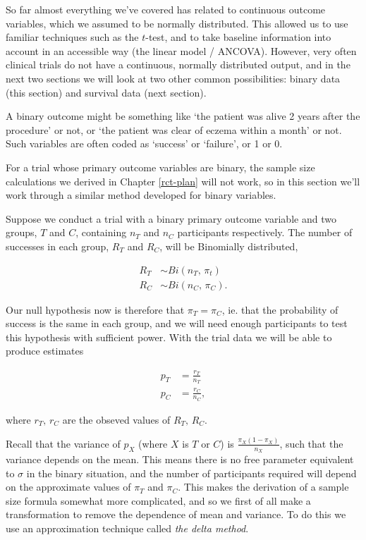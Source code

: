 \documentclass[
  openany]{book}
\theoremstyle{definition}
\theoremstyle{definition}
\theoremstyle{definition}
\theoremstyle{definition}
\theoremstyle{remark}
\begin{document}
So far almost everything we've covered has related to continuous outcome variables, which we assumed to be normally distributed. This allowed us to use familiar techniques such as the \(t\)-test, and to take baseline information into account in an accessible way (the linear model / ANCOVA). However, very often clinical trials do not have a continuous, normally distributed output, and in the next two sections we will look at two other common possibilities: binary data (this section) and survival data (next section).

A binary outcome might be something like `the patient was alive 2 years after the procedure' or not, or `the patient was clear of eczema within a month' or not. Such variables are often coded as `success' or `failure', or 1 or 0.

For a trial whose primary outcome variables are binary, the sample size calculations we derived in Chapter \ref{rct-plan} will not work, so in this section we'll work through a similar method developed for binary variables.

Suppose we conduct a trial with a binary primary outcome variable and two groups, \(T\) and \(C\), containing \(n_T\) and \(n_C\) participants respectively. The number of successes in each group, \(R_T\) and \(R_C\), will be Binomially distributed,

\begin{align*}
      R_T &\sim{Bi\left(n_T,\, \pi_t\right)} \\
      R_C &\sim{Bi\left(n_C,\,\pi_C\right)}.
\end{align*}

Our null hypothesis now is therefore that \(\pi_T = \pi_C\), ie. that the probability of success is the same in each group, and we will need enough participants to test this hypothesis with sufficient power. With the trial data we will be able to produce estimates

\begin{align*}
      p_T & = \frac{r_T}{n_T} \\
      p_C & = \frac{r_C}{n_C},
\end{align*}

where \(r_T,\,r_C\) are the obseved values of \(R_T,\,R_C.\)

Recall that the variance of \(p_X\) (where \(X\) is \(T\) or \(C\)) is \(\frac{\pi_X\left(1-\pi_X\right)}{n_X}\), such that the variance depends on the mean. This means there is no free parameter equivalent to \(\sigma\) in the binary situation, and the number of participants required will depend on the approximate values of \(\pi_T\) and \(\pi_C\). This makes the derivation of a sample size formula somewhat more complicated, and so we first of all make a transformation to remove the dependence of mean and variance. To do this we use an approximation technique called \emph{the delta method}.
\end{document}
